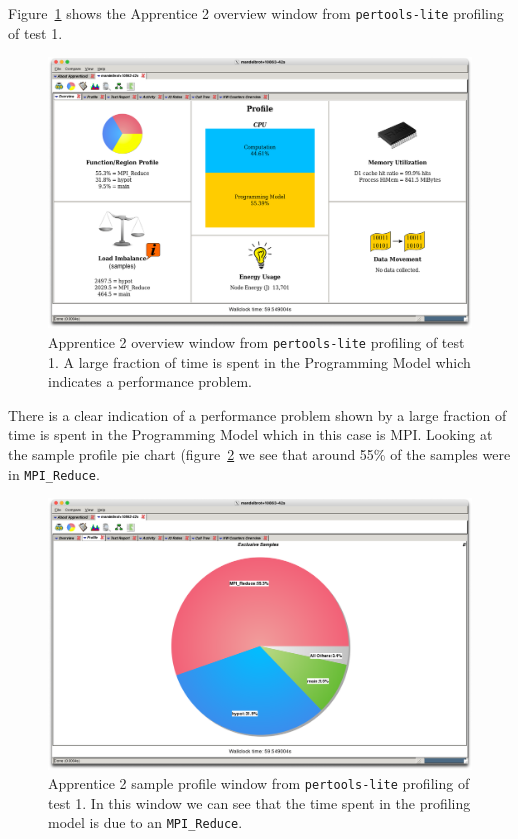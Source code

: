 \documentclass[a4paper,titlepage]{article}
\begin{document}
Figure~\ref{fig:app2_summary} shows the Apprentice 2 overview window from \texttt{pertools-lite} profiling of test 1. 
\begin{figure}[htbp]
\begin{center}
\includegraphics[scale=0.3]{figures/app2_summary}
\caption{Apprentice 2 overview window from \texttt{pertools-lite} profiling of test 1. A large fraction of time is spent in the Programming Model which indicates a performance problem.}
\label{fig:app2_summary}
\end{center}
\end{figure}
There is a clear indication of a performance problem shown by a large fraction of time is spent in the Programming Model which in this case is MPI. Looking at the sample profile pie chart (figure~\ref{fig:app2_pie} we see that around 55\% of the samples were in \texttt{MPI\_Reduce}.
\begin{figure}[htbp]
\begin{center}
\includegraphics[scale=0.3]{figures/app2_pie}
\caption{Apprentice 2 sample profile window from \texttt{pertools-lite} profiling of test 1. In this window we can see that the time spent in the profiling model is due to an \texttt{MPI\_Reduce}.}
\label{fig:app2_pie}
\end{center}
\end{figure}
\end{document}
